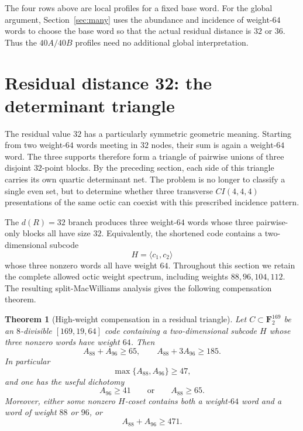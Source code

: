 \documentclass[11pt,reqno]{amsart}
\newtheorem{theorem}{Theorem}[section]
\theoremstyle{remark}
\newcommand{\F}{\mathbf F}
\begin{document}
The four rows above are local profiles for a fixed base word.  For the global argument, Section~\ref{sec:many} uses the abundance and incidence of weight-$64$ words to choose the base word so that the actual residual distance is $32$ or $36$.  Thus the $40A/40B$ profiles need no additional global interpretation.

\section{Residual distance 32: the determinant triangle}\label{sec:triangle}
The residual value $32$ has a particularly symmetric geometric meaning.  Starting from two weight-$64$ words meeting in $32$ nodes, their sum is again a weight-$64$ word.  The three supports therefore form a triangle of pairwise unions of three disjoint $32$-point blocks.  By the preceding section, each side of this triangle carries its own quartic determinant net.  The problem is no longer to classify a single even set, but to determine whether three transverse $CI(4,4,4)$ presentations of the same octic can coexist with this prescribed incidence pattern.

The $d(R)=32$ branch produces three weight-$64$ words whose three pairwise-only blocks all have size $32$.  Equivalently, the shortened code contains a two-dimensional subcode
\[
H=\langle c_1,c_2\rangle
\]
whose three nonzero words all have weight $64$.  Throughout this section we retain the complete allowed octic weight spectrum, including weights $88,96,104,112$.  The resulting split-MacWilliams analysis gives the following compensation theorem.

\begin{theorem}[High-weight compensation in a residual triangle]\label{thm:triangle-highweights}
Let $C\subset\F_2^{169}$ be an $8$-divisible $[169,19,64]$ code containing a two-dimensional subcode $H$ whose three nonzero words have weight $64$.  Then
\[
A_{88}+A_{96}\ge65,
\qquad
A_{88}+3A_{96}\ge185.
\]
In particular
\[
\max\{A_{88},A_{96}\}\ge47,
\]
and one has the useful dichotomy
\[
A_{96}\ge41\qquad\text{or}\qquad A_{88}\ge65.
\]
Moreover, either some nonzero $H$-coset contains both a weight-$64$ word and a word of weight $88$ or $96$, or
\[
A_{88}+A_{96}\ge471.
\]
\end{theorem}
\end{document}
